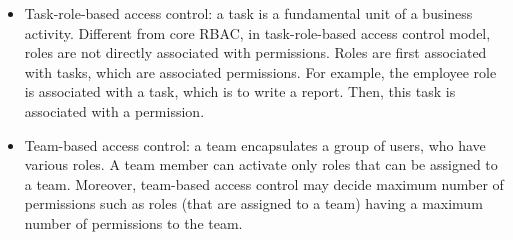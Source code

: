 \begin{itemize}

	\item Task-role-based access control: a task is a fundamental unit of a business activity. Different from core RBAC, in task-role-based access control model, roles are not directly associated with permissions. Roles are first associated with tasks, which are associated permissions. For example, the employee role is associated with a task, which is to write a report. Then, this task is associated with a permission.

	\item Team-based access control: a team encapsulates a group of users, who have various roles. A team member can activate only roles that can be assigned to a team. Moreover, team-based access control may decide maximum number of permissions such as roles (that are assigned to a team) having a maximum number of permissions to the team.			
\end{itemize}



